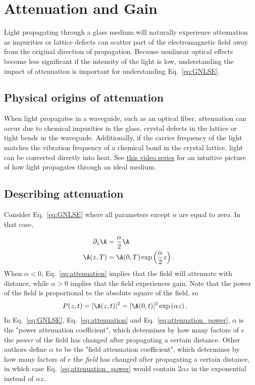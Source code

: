 \chapter{Attenuation and Gain}
\label{ch:attenuation}


Light propagating through a glass medium will naturally experience attenuation as impurities or lattice defects can scatter part of the electromagnetic field away from the original direction of propagation. Because nonlinear optical effects become less significant if the intensity of the light is low, understanding the impact of attenuation is important for understanding Eq.~\ref{eq:GNLSE}.


\section{Physical origins of attenuation}
When light propagates in a waveguide, such as an optical fiber, attenuation can occur due to chemical impurities in the glass, crystal defects in the lattice or tight bends in the waveguide. Additionally, if the carrier frequency of the light matches the vibration frequency of a chemical bond in the crystal lattice, light can be converted directly into heat. See \href{https://www.youtube.com/watch?v=QCX62YJCmGk&list=PLZHQObOWTQDMKqfyUvG2kTlYt-QQ2x-ui}{this video series} for an intuitive picture of how light propagates through an ideal medium. 


\section{Describing attenuation}

Consider Eq.~\ref{eq:GNLSE} where all parameters except $\alpha$ are equal to zero. In that case,

\begin{align}
    \label{eq:attenuation}
    \partial_z\A &= \frac{\alpha}{2} \A \\ \nonumber
    \A(z,T)&=\A(0,T)\exp\left( \frac{\alpha}{2}z \right). 
\end{align}
When $\alpha<0$, Eq.~\ref{eq:attenuation} implies that the field will attenuate with distance, while $\alpha>0$ implies that the field experiences gain. Note that the power of the field is proportional to the absolute square of the field, so
\begin{align}
    \label{eq:attenuation_power}
    P(z,t)=|\A(z,t)|^2&=|\A(0,t)|^2 \exp\left( \alpha z \right). 
\end{align}
In Eq.~\ref{eq:GNLSE}, Eq.~\ref{eq:attenuation} and Eq.~\ref{eq:attenuation_power}, $\alpha$ is the "power attenuation coefficient", which determines by how many factors of $e$ the \emph{power} of the field has changed after propagating a certain distance. Other authors define $\alpha$ to be the "field attenuation coefficient", which determines by how many factors of $e$ the \emph{field} has changed after propagating a certain distance, in which case Eq.~\ref{eq:attenuation_power} would contain $2\alpha z$ in the exponential instead of $\alpha z$. 

